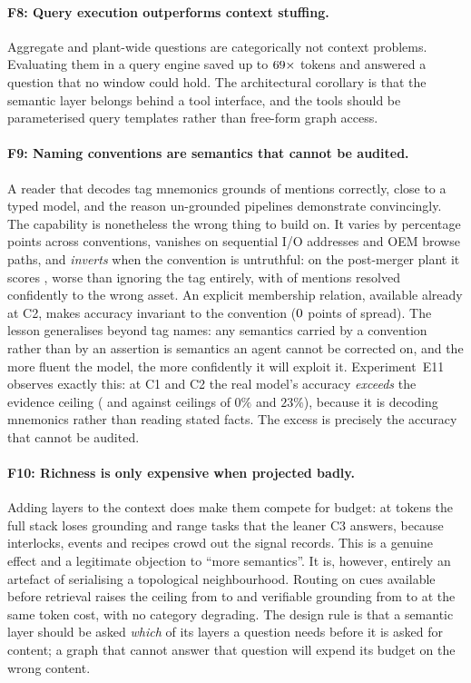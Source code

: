 \paragraph{F8: Query execution outperforms context stuffing.} Aggregate and
plant-wide questions are categorically not context problems. Evaluating them in a
query engine saved up to $69\times$ tokens and answered a question
that no window could hold. The architectural corollary is that the semantic layer
belongs behind a tool interface, and the tools should be parameterised query
templates rather than free-form graph access.

\paragraph{F9: Naming conventions are semantics that cannot be audited.}
A reader that decodes tag mnemonics grounds \ConvMnemonicDecoded{} of mentions
correctly, close to a typed model, and the reason un-grounded pipelines
demonstrate convincingly. The capability is nonetheless the wrong thing to build
on. It varies by \ConvSpreadCOnePlusconv{} percentage points across conventions,
vanishes on sequential I/O addresses and OEM browse paths, and \emph{inverts}
when the convention is untruthful: on the post-merger plant it scores
\ConvLyingDecoded{}, worse than ignoring the tag entirely, with
\ConvLyingWrong{} of mentions resolved confidently to the wrong asset. An
explicit membership relation, available already at C2, makes accuracy
invariant to the convention ($0{}$ points of spread). The
lesson generalises beyond tag names: any semantics carried by a convention
rather than by an assertion is semantics an agent cannot be corrected on, and
the more fluent the model, the more confidently it will exploit it.
Experiment~E11 observes exactly this: at C1 and C2 the real model's accuracy
\emph{exceeds} the evidence ceiling (\EllAccCOne{} and \EllAccCTwo{} against
ceilings of $0\%$ and $23\%$), because it is decoding mnemonics rather than
reading stated facts. The excess is precisely the accuracy that cannot be audited.

\paragraph{F10: Richness is only expensive when projected badly.} Adding
layers to the context does make them compete for budget: at
\TokenBudget{} tokens the full stack loses grounding and range tasks that the
leaner C3 answers, because interlocks, events and recipes crowd out the signal
records. This is a genuine effect and a legitimate objection to ``more
semantics''. It is, however, entirely an artefact of serialising a topological
neighbourhood. Routing on cues available before retrieval raises the ceiling
from
\RouteCFourNeighCeiling{} to \RouteCFourRoutedCeiling{} and verifiable grounding
from \RouteCFourNeighVerif{} to \RouteCFourRoutedVerif{} at the same token cost,
with no category degrading. The design rule is that a semantic layer should be
asked \emph{which} of its layers a question needs before it is asked for
content; a graph that cannot answer that question will expend its budget on the
wrong content.

